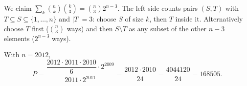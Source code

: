 We claim $\displaystyle\sum_{k}\binom nk\binom k3=\binom n32^{n-3}$. The left side counts pairs $(S,T)$ with $T\subseteq S\subseteq\{1,\dots,n\}$ and $|T|=3$: choose $S$ of size $k$, then $T$ inside it. Alternatively choose $T$ first ($\binom n3$ ways) and then $S\setminus T$ as any subset of the other $n-3$ elements ($2^{n-3}$ ways).

With $n=2012$,
\[P=\dfrac{\dfrac{2012\cdot2011\cdot2010}{6}\cdot2^{2009}}{2011\cdot2^{2011}}=\dfrac{2012\cdot2010}{24}=\dfrac{4044120}{24}=\boxed{168505}.\]

